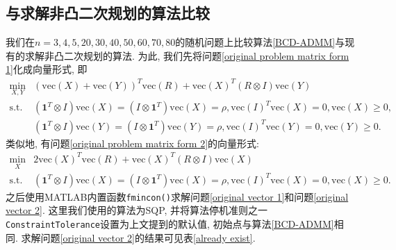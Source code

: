 \documentclass[UTF8,10.5pt,a4paper]{ctexart}
\theoremstyle{definition}
\theoremstyle{definition}
\newcommand{\vectorize}{\mathrm{vec}}
\newcommand{\st}{\mathrm{s.t.}}
\newcommand{\one}{\mathbf{1}}
\begin{document}
\subsection{与求解非凸二次规划的算法比较}
我们在$n=3,4,5,20,30,40,50,60,70,80$的随机问题上比较算法\ref{BCD-ADMM}与现有的求解非凸二次规划的算法. 为此, 我们先将问题\eqref{original problem matrix form 1}化成向量形式, 即
\begin{equation}\begin{array}{rl}
	\min\limits_{X,Y} & \left(\vectorize(X)+\vectorize(Y)\right)^T\vectorize(R)+\vectorize(X)^T(R\otimes I)\vectorize(Y)\\
	\st & \left(\one^T\otimes I\right)\vectorize(X)=\left(I\otimes \one^T\right)\vectorize(X)=\rho,\vectorize(I)^T\vectorize(X)=0,\vectorize(X)\ge0,\\
	 & \left(\one^T\otimes I\right)\vectorize(Y)=\left(I\otimes \one^T\right)\vectorize(Y)=\rho,\vectorize(I)^T\vectorize(Y)=0,\vectorize(Y)\ge0.
\end{array}\label{original vector 1}\end{equation}
类似地, 有问题\eqref{original problem matrix form 2}的向量形式:
\begin{equation}\begin{array}{rl}
	\min\limits_{X} & 2\vectorize(X)^T\vectorize(R)+\vectorize(X)^T(R\otimes I)\vectorize(X)\\
	\st & \left(\one^T\otimes I\right)\vectorize(X)=\left(I\otimes \one^T\right)\vectorize(X)=\rho,\vectorize(I)^T\vectorize(X)=0,\vectorize(X)\ge0.
\end{array}\label{original vector 2}\end{equation}
之后使用MATLAB内置函数\texttt{fmincon()}求解问题\eqref{original vector 1}和问题\eqref{original vector 2}. 这里我们使用的算法为SQP, 并将算法停机准则之一\texttt{ConstraintTolerance}设置为上文提到的默认值, 初始点与算法\ref{BCD-ADMM}相同. 求解问题\eqref{original vector 2}的结果可见表\ref{already exist}.
\end{document}
